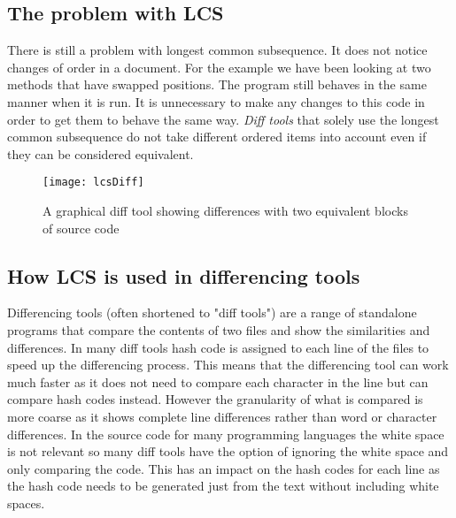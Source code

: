 
\subsection{The problem with LCS}
There is still a problem with longest common subsequence. It does not notice changes of order in a document.  For the example we have been looking at two methods that have swapped positions.  The program still behaves in the same manner when it is run.  It is unnecessary to make any changes to this code in order to get them to behave the same way. \emph{Diff tools} that solely use the longest common subsequence do not take different ordered items into account even if they can be considered equivalent.

\begin{figure}[h]
\begin{center}
\texttt{[image: lcsDiff]}
\end{center}
 \caption{A graphical diff tool showing differences with two equivalent blocks of source code}
\end{figure}

\subsection{How LCS is used in differencing tools}
Differencing tools (often shortened to "diff tools") are a range of standalone programs that compare the contents of two files and show the similarities and differences.
In many diff tools hash code is assigned to each line of the files to speed up the differencing process.
This means that the differencing tool can work much faster as it does not need to compare each character in the line but can compare hash codes instead.
However the granularity of what is compared is more coarse as it shows complete line differences rather than word or character differences. 
In the source code for many programming languages the white space is not relevant so many diff tools have the option of ignoring the white space and only comparing the code.
This has an impact on the hash codes for each line as the hash code needs to be generated just from the text without including white spaces.

